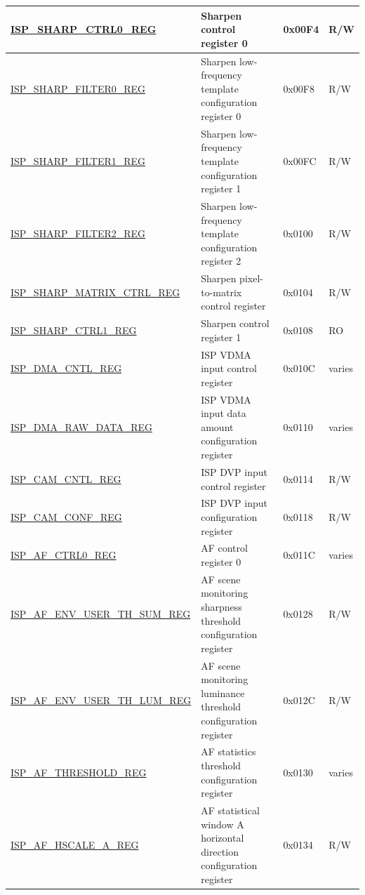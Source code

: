 \begin{longtable}{ | p{6cm} | p{7.2cm} | p{1.3cm} | p{1cm} | }
\hyperref[regdesc:ISPSHARPCTRL0REG]{ISP\_SHARP\_CTRL0\_REG} & Sharpen control register 0 & 0x00F4 & R/W \\ \hline
\hyperref[regdesc:ISPSHARPFILTER0REG]{ISP\_SHARP\_FILTER0\_REG} & Sharpen low-frequency template configuration register 0 & 0x00F8 & R/W \\ \hline
\hyperref[regdesc:ISPSHARPFILTER1REG]{ISP\_SHARP\_FILTER1\_REG} & Sharpen low-frequency template configuration register 1 & 0x00FC & R/W \\ \hline
\hyperref[regdesc:ISPSHARPFILTER2REG]{ISP\_SHARP\_FILTER2\_REG} & Sharpen low-frequency template configuration register 2 & 0x0100 & R/W \\ \hline
\hyperref[regdesc:ISPSHARPMATRIXCTRLREG]{ISP\_SHARP\_MATRIX\_CTRL\_REG} & Sharpen pixel-to-matrix control register & 0x0104 & R/W \\ \hline
\hyperref[regdesc:ISPSHARPCTRL1REG]{ISP\_SHARP\_CTRL1\_REG} & Sharpen control register 1 & 0x0108 & RO \\ \hline
\hyperref[regdesc:ISPDMACNTLREG]{ISP\_DMA\_CNTL\_REG} & ISP VDMA input control register & 0x010C & varies \\ \hline
\hyperref[regdesc:ISPDMARAWDATAREG]{ISP\_DMA\_RAW\_DATA\_REG} & ISP VDMA input data amount configuration register & 0x0110 & varies \\ \hline
\hyperref[regdesc:ISPCAMCNTLREG]{ISP\_CAM\_CNTL\_REG} & ISP DVP input control register & 0x0114 & R/W \\ \hline
\hyperref[regdesc:ISPCAMCONFREG]{ISP\_CAM\_CONF\_REG} & ISP DVP input configuration register & 0x0118 & R/W \\ \hline
\hyperref[regdesc:ISPAFCTRL0REG]{ISP\_AF\_CTRL0\_REG} & AF control register 0 & 0x011C & varies \\ \hline
\hyperref[regdesc:ISPAFENVUSERTHSUMREG]{ISP\_AF\_ENV\_USER\_TH\_SUM\_REG} & AF scene monitoring sharpness threshold configuration register & 0x0128 & R/W \\ \hline
\hyperref[regdesc:ISPAFENVUSERTHLUMREG]{ISP\_AF\_ENV\_USER\_TH\_LUM\_REG} & AF scene monitoring luminance threshold configuration register & 0x012C & R/W \\ \hline
\hyperref[regdesc:ISPAFTHRESHOLDREG]{ISP\_AF\_THRESHOLD\_REG} & AF statistics threshold configuration register & 0x0130 & varies \\ \hline
\hyperref[regdesc:ISPAFHSCALEAREG]{ISP\_AF\_HSCALE\_A\_REG} & AF statistical window A horizontal direction configuration register & 0x0134 & R/W \\ \hline

\end{longtable}
